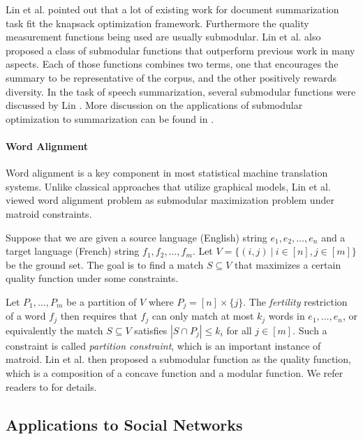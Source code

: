 Lin et al. \cite{LB11} pointed out that a lot of existing work for document summarization task fit the knapsack optimization framework. Furthermore the quality measurement functions being used are usually submodular. Lin et al. also proposed a class of submodular functions that outperform previous work in many aspects. Each of those functions combines two terms, one that encourages the summary to be representative of the corpus, and the other positively rewards diversity. In the task of speech summarization, several submodular functions were discussed by Lin \cite{L12}. More discussion on the applications of submodular optimization to summarization can be found in \cite{L12}.

\paragraph{Word Alignment}
Word alignment is a key component in most statistical machine translation systems. Unlike classical approaches that utilize graphical models, Lin et al. \cite{LB11word} viewed word alignment problem as submodular maximization problem under matroid constraints. 

Suppose that we are given a source language (English) string $e_1, e_2, \ldots, e_n$ and a target language (French) string $f_1, f_2, \ldots, f_m$. Let $V = \{(i, j) ~|~ i\in[n], j\in[m] \}$ be the ground set. The goal is to find a match $S\subseteq V$ that maximizes a certain quality function under some constraints. 

Let $P_1, \ldots, P_m$ be a partition of $V$ where $P_j = [n]\times \{j\}$. The \emph{fertility} restriction of a word $f_j$ then requires that $f_j$ can only match at most $k_j$ words in $e_1,\ldots, e_n$, or equivalently the match $S \subseteq V$ satisfies $|S \cap P_j| \leq k_i$ for all $j\in[m]$. Such a constraint is called \emph{partition constraint}, which is an important instance of matroid. Lin et al. then proposed a submodular function as the quality function, which is a composition of a concave function and a modular function. We refer readers to \cite{LB11word} for details.





\subsection{Applications to Social Networks}
